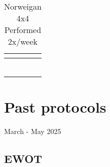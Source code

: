 \documentclass[
  letterpaper,
  DIV=11,
  numbers=noendperiod]{scrreprt}
\begin{document}
\begin{table}
\caption*{
{\large Norweigan 4x4} \\ 
{\small Performed 2x/week}
} 
\fontsize{12.0pt}{14.4pt}\selectfont
\begin{tabular*}{1\linewidth}{@{\extracolsep{\fill}}llll}
\toprule
{\bfseries \cellcolor[HTML]{D9D9D9}{Activity}} & {\bfseries \cellcolor[HTML]{D9D9D9}{Instructions}} & {\bfseries \cellcolor[HTML]{D9D9D9}{Duration}} & {\bfseries \cellcolor[HTML]{D9D9D9}{Intensity}} \\ 
\midrule\addlinespace[2.5pt]
\multicolumn{4}{>{\raggedright\arraybackslash}m{1\linewidth}}{{\bfseries \cellcolor[HTML]{B3B3B3}{1. WARMUP}}} \\[2.5pt] 
\midrule\addlinespace[2.5pt]
{\bfseries \cellcolor[HTML]{E6F2FF}{Easy warmup}} & {\cellcolor[HTML]{E6F2FF}{Moderate activity with oxygen}} & {\cellcolor[HTML]{E6F2FF}{10 minutes}} & {\cellcolor[HTML]{E6F2FF}{Low (40-50\%)}} \\ 
\midrule\addlinespace[2.5pt]
\multicolumn{4}{>{\raggedright\arraybackslash}m{1\linewidth}}{{\bfseries \cellcolor[HTML]{B3B3B3}{2. SPRINT CLUSTERS (Repeat 3-5 clusters)}}} \\[2.5pt] 
\midrule\addlinespace[2.5pt]
{\bfseries \cellcolor[HTML]{FFECEC}{Sprint Interval}} & {\cellcolor[HTML]{FFECEC}{80-95\% effort with oxygen}} & {\cellcolor[HTML]{FFECEC}{4 minutes}} & {\bfseries \cellcolor[HTML]{FFECEC}{\textcolor[HTML]{CC0000}{High (80-95\% max)}}} \\ 
{\bfseries \cellcolor[HTML]{FFF2CC}{Rest Interval}} & {\cellcolor[HTML]{FFF2CC}{Light recovery effort with oxygen}} & {\cellcolor[HTML]{FFF2CC}{3 minutes}} & {\cellcolor[HTML]{FFF2CC}{Low (40-50\%)}} \\ 
{\bfseries \cellcolor[HTML]{F0F0F0}{Repeat}} & {\cellcolor[HTML]{F0F0F0}{Perform 4 sets}} & {\cellcolor[HTML]{F0F0F0}{-}} & {\cellcolor[HTML]{F0F0F0}{-}} \\ 
\bottomrule
\end{tabular*}
\end{table}

\section{Past protocols}\label{past-protocols}

March - May 2025

\subsection{EWOT}\label{ewot-1}
\end{document}
